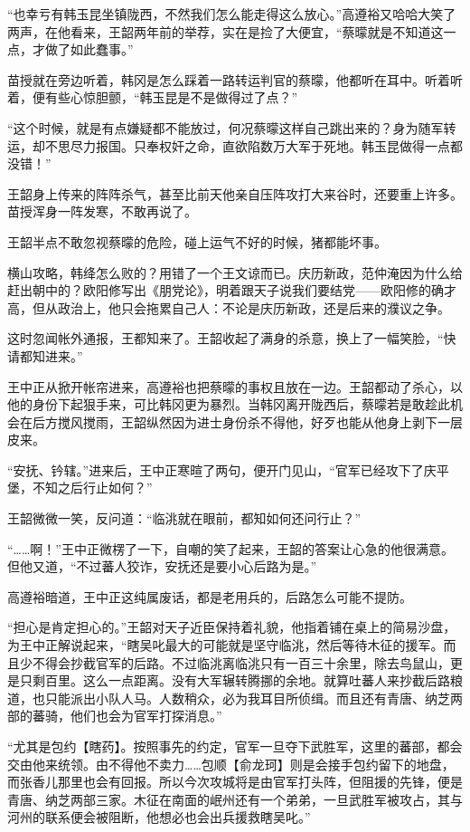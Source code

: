 “也幸亏有韩玉昆坐镇陇西，不然我们怎么能走得这么放心。”高遵裕又哈哈大笑了两声，在他看来，王韶两年前的举荐，实在是捡了大便宜，“蔡曚就是不知道这一点，才做了如此蠢事。”

苗授就在旁边听着，韩冈是怎么踩着一路转运判官的蔡曚，他都听在耳中。听着听着，便有些心惊胆颤，“韩玉昆是不是做得过了点？”

“这个时候，就是有点嫌疑都不能放过，何况蔡曚这样自己跳出来的？身为随军转运，却不思尽力报国。只奉权奸之命，直欲陷数万大军于死地。韩玉昆做得一点都没错！”

王韶身上传来的阵阵杀气，甚至比前天他亲自压阵攻打大来谷时，还要重上许多。苗授浑身一阵发寒，不敢再说了。

王韶半点不敢忽视蔡曚的危险，碰上运气不好的时候，猪都能坏事。

横山攻略，韩绛怎么败的？用错了一个王文谅而已。庆历新政，范仲淹因为什么给赶出朝中的？欧阳修写出《朋党论》，明着跟天子说我们要结党——欧阳修的确才高，但从政治上，他只会拖累自己人：不论是庆历新政，还是后来的濮议之争。

这时忽闻帐外通报，王都知来了。王韶收起了满身的杀意，换上了一幅笑脸，“快请都知进来。”

王中正从掀开帐帘进来，高遵裕也把蔡曚的事权且放在一边。王韶都动了杀心，以他的身份下起狠手来，可比韩冈更为暴烈。当韩冈离开陇西后，蔡曚若是敢趁此机会在后方搅风搅雨，王韶纵然因为进士身份杀不得他，好歹也能从他身上剥下一层皮来。

“安抚、钤辖。”进来后，王中正寒暄了两句，便开门见山，“官军已经攻下了庆平堡，不知之后行止如何？”

王韶微微一笑，反问道：“临洮就在眼前，都知如何还问行止？”

“……啊！”王中正微楞了一下，自嘲的笑了起来，王韶的答案让心急的他很满意。但他又道，“不过蕃人狡诈，安抚还是要小心后路为是。”

高遵裕暗道，王中正这纯属废话，都是老用兵的，后路怎么可能不提防。

“担心是肯定担心的。”王韶对天子近臣保持着礼貌，他指着铺在桌上的简易沙盘，为王中正解说起来，“瞎吴叱最大的可能就是坚守临洮，然后等待木征的援军。而且少不得会抄截官军的后路。不过临洮离临洮只有一百三十余里，除去鸟鼠山，更是只剩百里。这么一点距离。没有大军辗转腾挪的余地。就算吐蕃人来抄截后路粮道，也只能派出小队人马。人数稍众，必为我耳目所侦缉。而且还有青唐、纳芝两部的蕃骑，他们也会为官军打探消息。”

“尤其是包约【瞎药】。按照事先的约定，官军一旦夺下武胜军，这里的蕃部，都会交由他来统领。由不得他不卖力……包顺【俞龙珂】则是会接手包约留下的地盘，而张香儿那里也会有回报。所以今次攻城将是由官军打头阵，但阻援的先锋，便是青唐、纳芝两部三家。木征在南面的岷州还有一个弟弟，一旦武胜军被攻占，其与河州的联系便会被阻断，他想必也会出兵援救瞎吴叱。”


